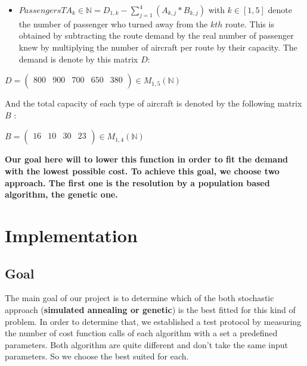 \documentclass[11pt]{article}
\providecommand{\tightlist}{%
      \setlength{\itemsep}{0pt}\setlength{\parskip}{0pt}}
\begin{document}
\begin{itemize}
\tightlist
\item
  \(PassengersTA_{k} \in \mathbb{N} = D_{1,k} - \sum_{j=1}^{4}(A_{k,j}*B_{k,j})\)
  with \(k \in [1,5]\) denote the number of passenger who turned away
  from the \(kth\) route. This is obtained by subtracting the route
  demand by the real number of passenger knew by multiplying the number
  of aircraft per route by their capacity. The demand is denote by this
  matrix \(D\):
\end{itemize}

\begin{center}
\(D = \left( \begin{array}{ccccc} 800 & 900 & 700 & 650 & 380\\ \end{array} \right)\in M_{1,5}(\mathbb{N})\)
\end{center}

And the total capacity of each type of aircraft is denoted by the
following matrix \(B\) :

\begin{center}
\(B = \left( \begin{array}{ccccc} 16 & 10 & 30 & 23 \\ \end{array} \right)\in M_{1,4}(\mathbb{N})\)
    
\end{center}

\textbf{Our goal here will to lower this function in order to fit the
demand with the lowest possible cost. To achieve this goal, we choose
two approach. The first one is the resolution by a population based
algorithm, the genetic one.}

\pagebreak

    \hypertarget{implementation}{%
\section{Implementation}\label{implementation}}

\hypertarget{goal}{%
\subsection{Goal}\label{goal}}

The main goal of our project is to determine which of the both
stochastic approach (\textbf{simulated annealing or genetic}) is the
best fitted for this kind of problem. In order to determine that, we
established a test protocol by measuring the number of cost function
calls of each algorithm with a set a predefined parameters. Both
algorithm are quite different and don't take the same input parameters.
So we choose the best suited for each.
\end{document}
